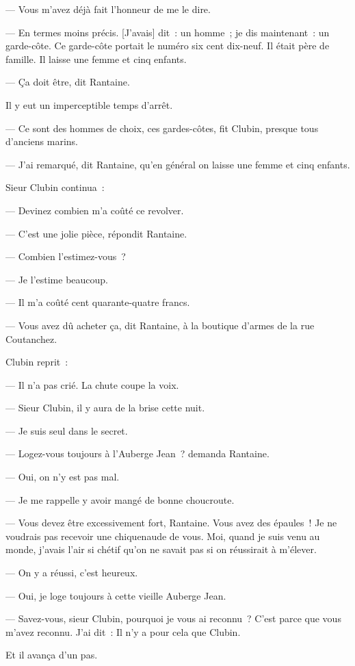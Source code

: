 \documentclass[french,twoside]{book} %
\newcommand\corr[1]{#1}
\begin{document}
— Vous m’avez déjà fait l’honneur de me le dire.\par
— En termes moins précis. [{\corr J’avais}] dit : un homme ; je dis maintenant : un garde-côte. Ce garde-côte portait le numéro six cent dix-neuf. Il était père de famille. Il laisse une femme et cinq enfants.\par
— Ça doit être, dit Rantaine.\par
Il y eut un imperceptible temps d’arrêt.\par
— Ce sont des hommes de choix, ces gardes-côtes, fit Clubin, presque tous d’anciens marins.\par
— J’ai remarqué, dit Rantaine, qu’en général on laisse une femme et cinq enfants.\par
Sieur Clubin continua :\par
— Devinez combien m’a coûté ce revolver.\par
— C’est une jolie pièce, répondit Rantaine.\par
— Combien l’estimez-vous ?\par
— Je l’estime beaucoup.\par
— Il m’a coûté cent quarante-quatre francs.\par
 — Vous avez dû acheter ça, dit Rantaine, à la boutique d’armes de la rue Coutanchez.\par
Clubin reprit :\par
— Il n’a pas crié. La chute coupe la voix.\par
— Sieur Clubin, il y aura de la brise cette nuit.\par
— Je suis seul dans le secret.\par
— Logez-vous toujours à l’Auberge Jean ? demanda Rantaine.\par
— Oui, on n’y est pas mal.\par
— Je me rappelle y avoir mangé de bonne choucroute.\par
— Vous devez être excessivement fort, Rantaine. Vous avez des épaules ! Je ne voudrais pas recevoir une chiquenaude de vous. Moi, quand je suis venu au monde, j’avais l’air si chétif qu’on ne savait pas si on réussirait à m’élever.\par
— On y a réussi, c’est heureux.\par
— Oui, je loge toujours à cette vieille Auberge Jean.\par
— Savez-vous, sieur Clubin, pourquoi je vous ai reconnu ? C’est parce que vous m’avez reconnu. J’ai dit : Il n’y a pour cela que Clubin.\par
Et il avança d’un pas.\par
\end{document}
